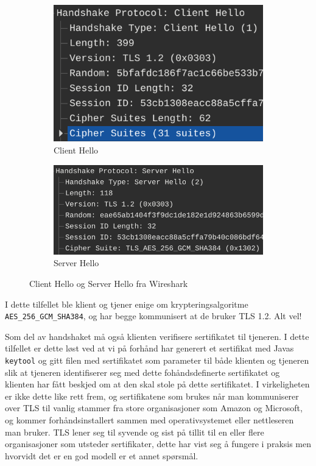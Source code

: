 \documentclass{article}
\begin{document}
\begin{figure}[ht]
    \begin{subfigure}{.48\linewidth}
        \includegraphics[width=\linewidth]{illustrasjoner/P4-TLS-client-hello.png}
        \caption{Client Hello}
    \end{subfigure}
    \hfill
    \begin{subfigure}{.48\linewidth}
        \includegraphics[width=\linewidth]{illustrasjoner/P4-TLS-server-hello.png}
        \caption{Server Hello}
    \end{subfigure}
    \caption{Client Hello og Server Hello fra Wireshark}
\end{figure}

I dette tilfellet ble klient og tjener enige om krypteringsalgoritme \texttt{AES\_256\_GCM\_SHA384}, og har begge kommunisert at de bruker TLS 1.2. Alt vel!

Som del av handshaket må også klienten verifisere sertifikatet til tjeneren. I dette tilfellet er dette løst ved at vi på forhånd har generert et sertifikat med Javas \texttt{keytool} og gitt filen med sertifikatet som parameter til både klienten og tjeneren slik at tjeneren identifiserer seg med dette fohåndsdefinerte sertifikatet og klienten har fått beskjed om at den skal stole på dette sertifikatet. I virkeligheten er ikke dette like rett frem, og sertifikatene som brukes når man kommuniserer over TLS til vanlig stammer fra store organisasjoner som Amazon og Microsoft, og kommer forhåndsinstallert sammen med operativsystemet eller nettleseren man bruker. TLS lener seg til syvende og sist på tillit til en eller flere organisasjoner som utsteder sertifikater, dette har vist seg å fungere i praksis men hvorvidt det er en god modell er et annet spørsmål.
\end{document}
